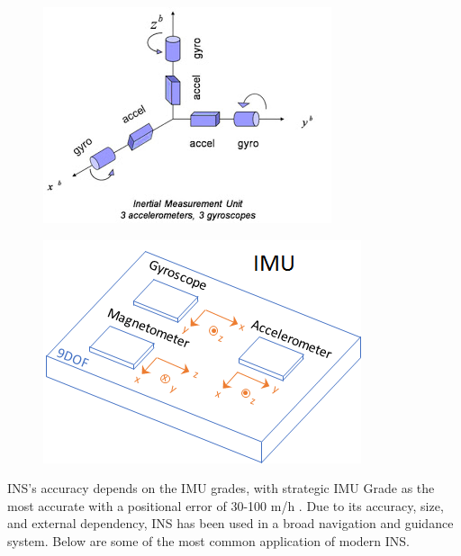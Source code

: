 \begin{figure}[!ht]
\centering
\begin{minipage}{.5\textwidth}
  \centering
  \includegraphics[height=0.7\linewidth]{Figures/imu_6dof.jpg}
  \label{fig:IMU6DOF}
\end{minipage}%
\begin{minipage}{.5\textwidth}
  \centering
  \includegraphics[height=0.7\linewidth]{Figures/imu_diagram.png}
  \label{fig:9DOFIMU}
\end{minipage}
\end{figure}


\noindent INS's accuracy depends on the IMU grades, with strategic IMU Grade as the most accurate with a positional error of 30-100 m/h \cite{El-Sheimy2020InertialTrends}. Due to its accuracy, size, and external dependency, INS has been used in a broad navigation and guidance system. Below are some of the most common application of modern INS.\\

